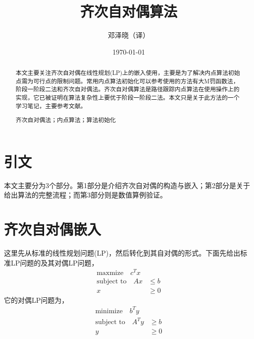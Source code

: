 \documentclass{ctexart}
\title{\textbf{齐次自对偶算法}}
\author{邓泽晓（译）}
\affil{中山大学航空航天学院，深圳，中国}
\date{\today}
\numberwithin{equation}{section} %
\begin{document}
	
	\maketitle
\begin{abstract}
	本文主要关注齐次自对偶在线性规划(LP)上的嵌入使用，主要是为了解决内点算法初始点需为可行点的限制问题。常用内点算法初始化可以参考使用的方法有大M罚函数法，阶段一阶段二法和齐次自对偶法。齐次自对偶算法是路径跟踪内点算法在使用操作上的实现，它已被证明在算法复杂性上要优于阶段一阶段二法。本文只是关于此方法的一个学习笔记，主要参考文献\cite{Robert2014}。
	
	 {齐次自对偶法；内点算法；算法初始化}
\end{abstract}

\section{引文}

本文主要分为3个部分。第1部分是介绍齐次自对偶的构造与嵌入；第2部分是关于给出算法的完整流程；而第3部分则是数值算例验证。

\section{齐次自对偶嵌入}
\label{se: HSDembedding}

这里先从标准的线性规划问题(LP)，然后转化到其自对偶的形式。下面先给出标准LP问题的及其对偶LP问题，
\begin{equation}
	\label{Eq: primalLP}
	\begin{aligned}
	\textrm{maxmize} \quad c^{T} x & \\
	\textrm{subject to} \quad Ax & \leq b \\
	x & \geq 0 
	\end{aligned}
\end{equation}
它的对偶LP问题为，
\begin{equation}
	\label{Eq: dualLP}
	\begin{aligned}
	\textrm{minimize} \quad b^{T} y & \\
	\textrm{subject to} \quad A^{T}y & \geq b \\
	y & \geq 0
	\end{aligned}
\end{equation}
\end{document}

